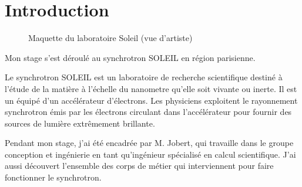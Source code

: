



			
\chapter*{Introduction}

\begin{figure}
  \centering
  \caption{Maquette du laboratoire Soleil (vue d'artiste)}
\end{figure}

     Mon stage s'est déroulé au synchrotron SOLEIL en région parisienne. 



		
     Le synchrotron SOLEIL est un laboratoire de recherche scientifique destiné à l'étude de la matière à l'échelle du nanometre qu'elle soit vivante ou inerte. Il est un équipé d'un accélérateur d'électrons. Les physiciens exploitent le rayonnement synchrotron émis par les électrons circulant dans l'accélérateur pour fournir des sources de lumière extrêmement brillante.

     Pendant mon stage, j'ai été encadrée par M. Jobert, qui travaille dans le groupe conception et ingénierie en tant qu'ingénieur spécialisé en calcul scientifique. J'ai aussi découvert l'ensemble des corps de métier qui interviennent pour faire fonctionner le synchrotron.
		

